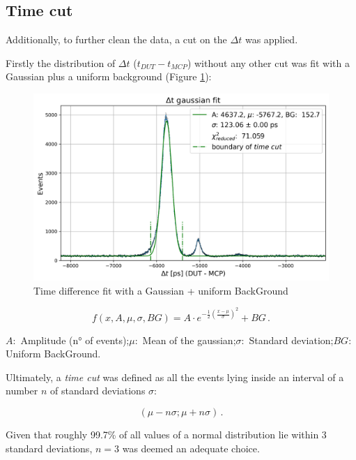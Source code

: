 \subsection{Time cut}\label{sec:time_cut}

Additionally, to further clean the data, a cut on the $\Delta t$ was applied.

Firstly the distribution of $\Delta t$ ($t_{DUT}-t_{MCP}$) without any other cut was fit with a Gaussian plus a uniform background (Figure \ref{fig:time_cut_gauss+bg_fit}):

\begin{figure}[!ht]
    \centering
    \includegraphics[width=.9\linewidth]{Images/plots_of_cuts/time_difference_603_S2_gauss_fit_no_cuts_DUT2.png}
    \caption{Time difference fit with a Gaussian + uniform BackGround}
    \label{fig:time_cut_gauss+bg_fit}
\end{figure}

\begin{equation*}
    f(x,A,\mu,\sigma,BG) = A \cdot e^{-\frac{1}{2}\left(\frac{x-\mu}{\sigma} \right)^2} + BG  \, .
\end{equation*}


$A:$ Amplitude (n° of events);\quad $\mu:$ Mean of the gaussian;\quad $\sigma:$ Standard deviation;\quad $BG:$ Uniform BackGround.

Ultimately, a \textit{time cut} was defined as all the events lying inside an interval of a number \(n\) of standard deviations \(\sigma\):

\begin{equation}
    (\mu-n\sigma;\mu+n\sigma) \, .
\end{equation}

Given that roughly 99.7\% of all values of a normal distribution lie within 3 standard deviations, $n=3$ was deemed an adequate choice.

